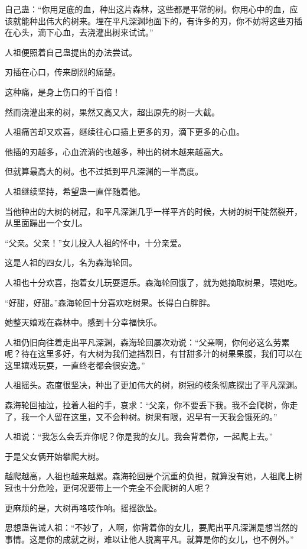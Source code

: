 \begin{this_body}
自己蛊：“你用足底的血，种出这片森林，这些都是平常的树。你用心中的血，应该就能种出伟大的树来。埋在平凡深渊地面下的，有许多的刃，你不妨将这些刃插在心头，滴下心血，去浇灌出树来试试。”

人祖便照着自己蛊提出的办法尝试。

刃插在心口，传来剧烈的痛楚。

这种痛，是身上伤口的千百倍！

然而浇灌出来的树，果然又高又大，超出原先的树一大截。

人祖痛苦却又欢喜，继续往心口插上更多的刃，滴下更多的心血。

他插的刃越多，心血流淌的也越多，种出的树木越来越高大。

但就算最高大的树。也不过抵到平凡深渊的一半高度。

人祖继续坚持，希望蛊一直伴随着他。

当他种出的大树的树冠，和平凡深渊几乎一样平齐的时候，大树的树干陡然裂开，从里面蹦出一个女儿。

“父亲。父亲！”女儿投入人祖的怀中，十分亲爱。

这是人祖的四女儿，名为森海轮回。

人祖也十分欢喜，抱着女儿玩耍逗乐。森海轮回饿了，就为她摘取树果，喂她吃。

“好甜，好甜。”森海轮回十分喜欢吃树果。长得白白胖胖。

她整天嬉戏在森林中。感到十分幸福快乐。

人祖仍旧向往着走出平凡深渊，森海轮回屡次劝说：“父亲啊，你何必这么劳累呢？待在这里多好，有大树为我们遮挡烈日，有甘甜多汁的树果果腹，我们可以在这里嬉戏玩耍，一直终老都会很安逸。”

人祖摇头。态度很坚决，种出了更加伟大的树，树冠的枝条彻底探出了平凡深渊。

森海轮回抽泣，拉着人祖的手，哀求：“父亲，你不要丢下我。我不会爬树，你走了，我一个人留在这里，又不会种树。树果有限，迟早有一天我会饿死的。”

人祖说：“我怎么会丢弃你呢？你是我的女儿。我会背着你，一起爬上去。”

于是父女俩开始攀爬大树。

越爬越高，人祖也越来越累。森海轮回是个沉重的负担，就算没有她，人祖爬上树冠也十分危险，更何况要带上一个完全不会爬树的人呢？

更麻烦的是，大树再咯吱作响。摇摇欲坠。

思想蛊告诫人祖：“不妙了，人啊，你背着你的女儿，要爬出平凡深渊是想当然的事情。这是你的成就之树，难以让他人脱离平凡。就算是你的女儿，也不例外。”


\end{this_body}
